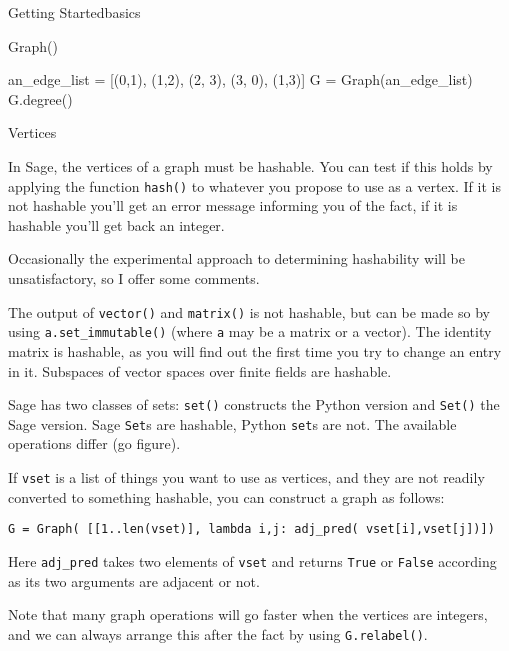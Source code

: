 \begin{chap}{Getting Started}{basics}
\begin{sect}{Graph()}
\begin{sagecode}
\begin{sageinput}
an_edge_list = [(0,1), (1,2), (2, 3), (3, 0), (1,3)]
G = Graph(an_edge_list)
G.degree()
\end{sageinput}
\begin{sageoutput}
[2, 3, 2, 3]
\end{sageoutput}
\end{sagecode}
%
\end{sect}
%
\begin{sect}{Vertices}
%
\begin{para}
In Sage, the vertices of a graph must be hashable. You can test if this holds 
by applying the function \verb|hash()| to whatever you propose to use as a vertex.
If it is not hashable you'll get an error message informing you of the fact, if it
is hashable you'll get back an integer.
\end{para}
%
\begin{para}
Occasionally the experimental approach to determining hashability will be 
unsatisfactory, so I offer some comments.
\end{para}
%
\begin{para}
The output of \verb|vector()| and \verb|matrix()| is not hashable, but can
be made so by using \verb|a.set_immutable()| (where \verb|a| may be a matrix
or a vector). The identity matrix is hashable, as you will find out the first 
time you try to change an entry in it. Subspaces of vector
spaces over finite fields are hashable.
\end{para}
%
\begin{para}
Sage has two classes of sets: \verb|set()| constructs the Python version and
\verb|Set()| the Sage version. Sage \verb|Set|s are hashable, Python \verb|set|s are not.
The available operations differ (go figure).
\end{para}
%
\begin{para}
If \verb|vset| is a list of things you want to use as vertices, and they are not 
readily converted to something hashable, you can construct a graph as follows:
\end{para}
%
\begin{para}
\verb|G = Graph( [[1..len(vset)], lambda i,j: adj_pred( vset[i],vset[j])])|
\end{para}
%
\begin{para}
Here \verb|adj_pred| takes two elements of \verb|vset| and returns
\verb|True| or \verb|False| according as its two arguments are adjacent or not.
\end{para}
%
\begin{para}
Note that many graph operations will go faster when the vertices are integers,
and we can always arrange this after the fact by using \verb|G.relabel()|.
\end{para}
%
\end{sect}
%
\end{chap}

